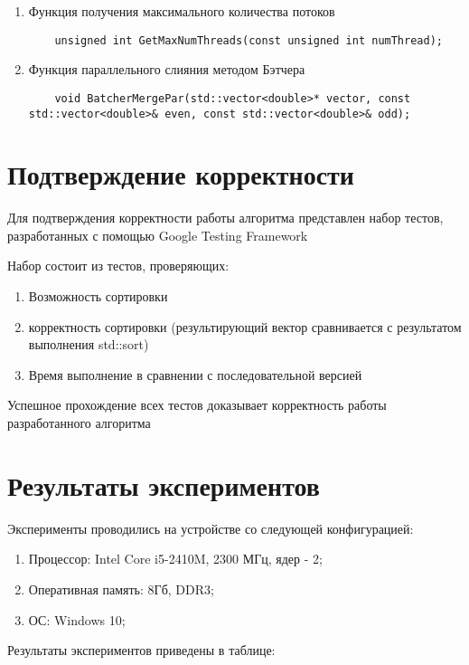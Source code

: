 \documentclass{report}
\begin{document}
\begin{enumerate}
\item Функция получения максимального количества потоков
\begin{lstlisting}
	unsigned int GetMaxNumThreads(const unsigned int numThread);
\end{lstlisting}

\item Функция параллельного слияния методом Бэтчера
\begin{lstlisting}
	void BatcherMergePar(std::vector<double>* vector, const std::vector<double>& even, const std::vector<double>& odd);
\end{lstlisting}
\end{enumerate}
\newpage

\section*{Подтверждение корректности}
\par Для подтверждения корректности работы алгоритма представлен набор тестов, разработанных с помощью Google Testing Framework
\par Набор состоит из тестов, проверяющих:
\begin{enumerate}
\item Возможность сортировки
\item корректность сортировки (результирующий вектор
сравнивается с результатом выполнения std::sort)
\item Время выполнение в сравнении с последовательной версией
\end{enumerate}
\par Успешное прохождение всех тестов доказывает корректность работы разработанного алгоритма

\section*{Результаты экспериментов}
Эксперименты проводились на устройстве со следующей конфигурацией:
\begin{enumerate}
\item Процессор: Intel Core i5-2410M, 2300 МГц, ядер - 2;
\item Оперативная память:  8Гб, DDR3;
\item ОС: Windows 10;
\end{enumerate}
 Результаты экспериментов приведены в таблице:
\end{document}
